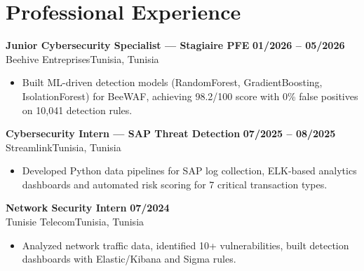 \documentclass[a4paper,9pt]{article}
\newcommand{\cventry}[4]{\textbf{#1} \hfill \textbf{#4}\\[1pt]#2{\ifx\relax#3\relax\else, #3\fi}\par\vspace{1pt}}
\begin{document}
\section{Professional Experience}
\cventry{Junior Cybersecurity Specialist --- Stagiaire PFE}{Beehive Entreprises}{Tunisia}{01/2026 -- 05/2026}
\begin{itemize}
  \item Built ML-driven detection models (RandomForest, GradientBoosting, IsolationForest) for BeeWAF, achieving 98.2/100 score with 0\% false positives on 10,041 detection rules.
\end{itemize}
\cventry{Cybersecurity Intern --- SAP Threat Detection}{Streamlink}{Tunisia}{07/2025 -- 08/2025}
\begin{itemize}
  \item Developed Python data pipelines for SAP log collection, ELK-based analytics dashboards and automated risk scoring for 7 critical transaction types.
\end{itemize}
\cventry{Network Security Intern}{Tunisie Telecom}{Tunisia}{07/2024}
\begin{itemize}
  \item Analyzed network traffic data, identified 10+ vulnerabilities, built detection dashboards with Elastic/Kibana and Sigma rules.
\end{itemize}
\end{document}
